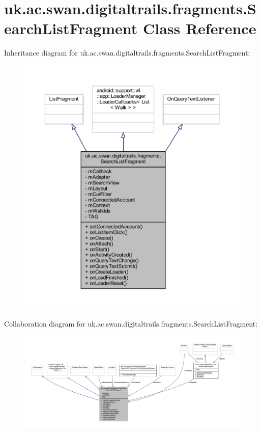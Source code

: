 \hypertarget{classuk_1_1ac_1_1swan_1_1digitaltrails_1_1fragments_1_1_search_list_fragment}{\section{uk.\+ac.\+swan.\+digitaltrails.\+fragments.\+Search\+List\+Fragment Class Reference}
\label{classuk_1_1ac_1_1swan_1_1digitaltrails_1_1fragments_1_1_search_list_fragment}
}


Inheritance diagram for uk.\+ac.\+swan.\+digitaltrails.\+fragments.\+Search\+List\+Fragment\+:
\nopagebreak
\begin{figure}[H]
\begin{center}
\leavevmode
\includegraphics[width=350pt]{classuk_1_1ac_1_1swan_1_1digitaltrails_1_1fragments_1_1_search_list_fragment__inherit__graph}
\end{center}
\end{figure}


Collaboration diagram for uk.\+ac.\+swan.\+digitaltrails.\+fragments.\+Search\+List\+Fragment\+:
\nopagebreak
\begin{figure}[H]
\begin{center}
\leavevmode
\includegraphics[width=350pt]{classuk_1_1ac_1_1swan_1_1digitaltrails_1_1fragments_1_1_search_list_fragment__coll__graph}
\end{center}
\end{figure}
